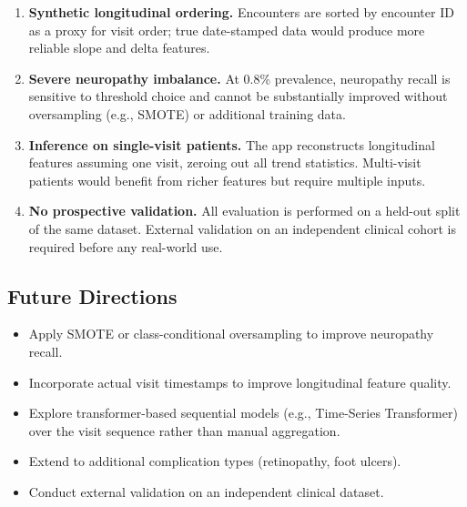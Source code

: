 \documentclass[12pt]{article}
\begin{document}
\begin{enumerate}
    \item \textbf{Synthetic longitudinal ordering.} Encounters are sorted by
          encounter ID as a proxy for visit order; true date-stamped data would
          produce more reliable slope and delta features.

    \item \textbf{Severe neuropathy imbalance.} At 0.8\% prevalence,
          neuropathy recall is sensitive to threshold choice and cannot be
          substantially improved without oversampling (e.g., SMOTE) or
          additional training data.

    \item \textbf{Inference on single-visit patients.} The app reconstructs
          longitudinal features assuming one visit, zeroing out all trend
          statistics. Multi-visit patients would benefit from richer features
          but require multiple inputs.

    \item \textbf{No prospective validation.} All evaluation is performed on
          a held-out split of the same dataset. External validation on an
          independent clinical cohort is required before any real-world use.
\end{enumerate}

\subsection{Future Directions}

\begin{itemize}
    \item Apply SMOTE or class-conditional oversampling to improve neuropathy recall.
    \item Incorporate actual visit timestamps to improve longitudinal feature quality.
    \item Explore transformer-based sequential models (e.g., Time-Series Transformer)
          over the visit sequence rather than manual aggregation.
    \item Extend to additional complication types (retinopathy, foot ulcers).
    \item Conduct external validation on an independent clinical dataset.
\end{itemize}
\end{document}
